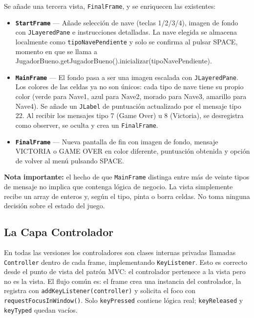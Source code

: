 \documentclass[12pt, a4paper]{article}
\begin{document}
\begin{cajafinal}
Se a\~{n}ade una tercera vista, \texttt{FinalFrame}, y se enriquecen las existentes:
 
\begin{itemize}
    \item \textbf{\texttt{StartFrame}} --- A\~{n}ade selecci\'{o}n de nave (teclas 1/2/3/4), imagen de fondo con \texttt{JLayeredPane} e instrucciones detalladas. La nave elegida se almacena localmente como \texttt{tipoNavePendiente} y solo se confirma al pulsar SPACE, momento en que se llama a JugadorBueno.getJugadorBueno().inicializar(tipoNavePendiente).
 
    \item \textbf{\texttt{MainFrame}} --- El fondo pasa a ser una imagen escalada con \texttt{JLayeredPane}. Los colores de las celdas ya no son \'{u}nicos: cada tipo de nave tiene su propio color (verde para Nave1, azul para Nave2, morado para Nave3, amarillo para Nave4). Se a\~{n}ade un \texttt{JLabel} de puntuaci\'{o}n actualizado por el mensaje tipo 22. Al recibir los mensajes tipo 7 (Game Over) u 8 (Victoria), se desregistra como observer, se oculta y crea un \texttt{FinalFrame}.
 
    \item \textbf{\texttt{FinalFrame}} --- Nueva pantalla de fin con imagen de fondo, mensaje \guillemotleft VICTORIA\guillemotright{} o \guillemotleft GAME OVER\guillemotright{} en color diferente, puntuaci\'{o}n obtenida y opci\'{o}n de volver al men\'{u} pulsando SPACE.
\end{itemize}
 
\textbf{Nota importante:} el hecho de que \texttt{MainFrame} distinga entre m\'{a}s de veinte tipos de mensaje no implica que contenga l\'{o}gica de negocio. La vista simplemente recibe un array de enteros y, seg\'{u}n el tipo, pinta o borra celdas. No toma ninguna decisi\'{o}n sobre el estado del juego.
\end{cajafinal}
 
\subsection{La Capa Controlador}
 
En todas las versiones los controladores son clases internas privadas llamadas \texttt{Controller} dentro de cada frame, implementando \texttt{KeyListener}. Esto es correcto desde el punto de vista del patr\'{o}n MVC: el controlador pertenece a la vista pero no es la vista. El flujo com\'{u}n es: el frame crea una instancia del controlador, la registra con \texttt{addKeyListener(controller)} y solicita el foco con \texttt{requestFocusInWindow()}. Solo \texttt{keyPressed} contiene l\'{o}gica real; \texttt{keyReleased} y \texttt{keyTyped} quedan vac\'{i}os.
 
\end{document}
